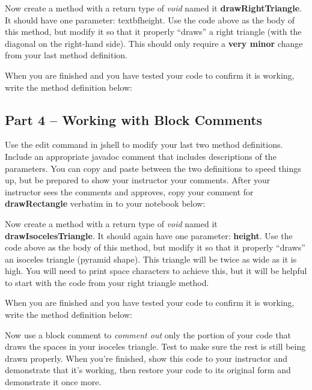 \begin{exer}
Now create a method with a return type of \textit{void} named it \textbf{drawRightTriangle}. It should have one parameter: textbf{height}. Use the code above as the body of this method, but modify it so that it properly ``draws'' a right triangle (with the diagonal on the right-hand side). This should only require a \textbf{very minor} change from your last method definition.  

When you are finished and you have tested your code to confirm it is working, write the method definition below:

\evallineeight
\end{exer}

\initialbox

\subsection{Part 4 -- Working with Block Comments}
\begin{exer}
Use the edit command in jshell to modify your last two method definitions. Include an appropriate javadoc comment that includes descriptions of the parameters. You can copy and paste between the two definitions to speed things up, but be prepared to show your instructor your comments. After your instructor sees the comments and approves, copy your comment for \textbf{drawRectangle} verbatim in to your notebook below:

\evallinesix
\end{exer}


\begin{exer}
Now create a method with a return type of \textit{void} named it \textbf{drawIsocelesTriangle}. It should again have one parameter: \textbf{height}. Use the code above as the body of this method, but modify it so that it properly ``draws'' an isoceles triangle (pyramid shape). This triangle will be twice as wide as it is high. You will need to print space characters to achieve this, but it will be helpful to start with the code from your right triangle method. 

When you are finished and you have tested your code to confirm it is working, write the method definition below:

\evallineeight
\end{exer}

\begin{exer}
Now use a block comment to \textit{comment out} only the portion of your code that draws the spaces in your isoceles triangle. Test to make sure the rest is still being drawn properly. When you're finished, show this code to your instructor and demonstrate that it's working, then restore your code to its original form and demonstrate it once more. 
\end{exer}

\initialbox
